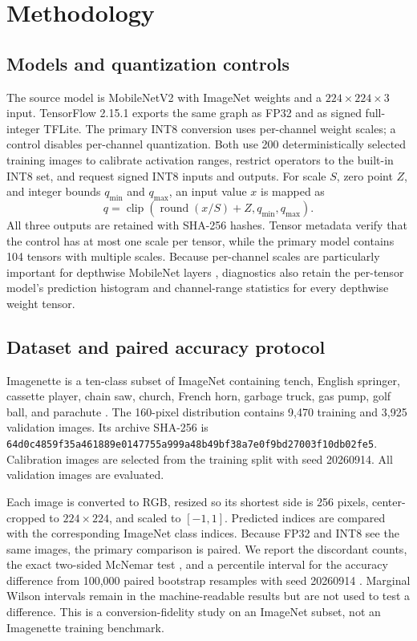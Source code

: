 \section{Methodology}
\label{sec:methodology}

\subsection{Models and quantization controls}

The source model is MobileNetV2 with ImageNet weights and a $224\times224\times3$ input. TensorFlow 2.15.1 exports the same graph as FP32 and as signed full-integer TFLite. The primary INT8 conversion uses per-channel weight scales; a control disables per-channel quantization. Both use 200 deterministically selected training images to calibrate activation ranges, restrict operators to the built-in INT8 set, and request signed INT8 inputs and outputs. For scale $S$, zero point $Z$, and integer bounds $q_{\min}$ and $q_{\max}$, an input value $x$ is mapped as
\begin{equation}
q=\operatorname{clip}(\operatorname{round}(x/S)+Z,q_{\min},q_{\max}).
\end{equation}
All three outputs are retained with SHA-256 hashes. Tensor metadata verify that the control has at most one scale per tensor, while the primary model contains 104 tensors with multiple scales. Because per-channel scales are particularly important for depthwise MobileNet layers \cite{krishnamoorthi2018}, diagnostics also retain the per-tensor model's prediction histogram and channel-range statistics for every depthwise weight tensor.

\subsection{Dataset and paired accuracy protocol}

Imagenette is a ten-class subset of ImageNet containing tench, English springer, cassette player, chain saw, church, French horn, garbage truck, gas pump, golf ball, and parachute \cite{imagenette}. The 160-pixel distribution contains 9,470 training and 3,925 validation images. Its archive SHA-256 is \nolinkurl{64d0c4859f35a461889e0147755a999a48b49bf38a7e0f9bd27003f10db02fe5}. Calibration images are selected from the training split with seed 20260914. All validation images are evaluated.

Each image is converted to RGB, resized so its shortest side is 256 pixels, center-cropped to $224\times224$, and scaled to $[-1,1]$. Predicted indices are compared with the corresponding ImageNet class indices. Because FP32 and INT8 see the same images, the primary comparison is paired. We report the discordant counts, the exact two-sided McNemar test \cite{mcnemar1947}, and a percentile interval for the accuracy difference from 100,000 paired bootstrap resamples with seed 20260914 \cite{efron1979}. Marginal Wilson intervals remain in the machine-readable results but are not used to test a difference. This is a conversion-fidelity study on an ImageNet subset, not an Imagenette training benchmark.

